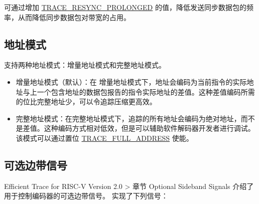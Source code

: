 \documentclass[main\_\_CN.tex]{subfiles}
\begin{document}
可通过增加 \hyperref[fielddesc:TRACERESYNCPROLONGED]{TRACE\_RESYNC\_PROLONGED} 的值，降低发送同步数据包的频率，从而降低同步数据包对带宽的占用。

\subsection{地址模式}

\chipname{} 支持两种地址模式：增量地址模式和完整地址模式。
\begin{itemize}
    \item 增量地址模式（默认）：在 增量地址模式下，地址会编码为当前指令的实际地址与上一个包含地址的数据包报告的指令实际地址的差值。这种差值编码所需的位比完整地址少，可以令追踪压缩更高效。
    \item 完整地址模式：在完整地址模式下，追踪的所有地址会编码为绝对地址，而不是差值。这种编码方式相对低效，但是可以辅助软件解码器开发者进行调试。该模式可以通过置位 \hyperref[fielddesc:TRACEFULLADDRESS]{TRACE\_FULL\_ADDRESS} 使能。
\end{itemize}

\subsection{可选边带信号}

Efficient Trace for RISC-V Version 2.0 > 章节 Optional Sideband Signals 介绍了用于控制编码器的可选边带信号。\chipname{} 实现了下列信号：
\end{document}
